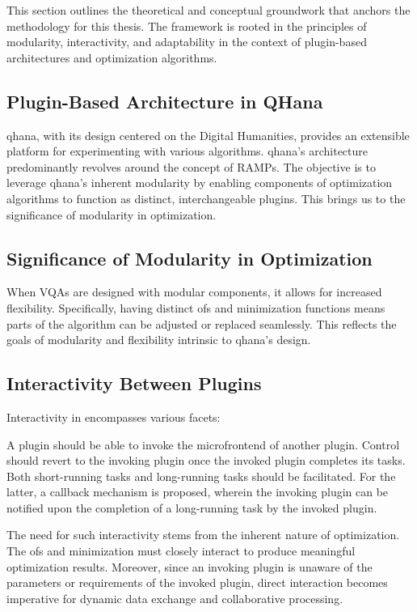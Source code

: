 \documentclass[
  a4paper,  %
  twoside,  %
  bibliography=totoc,
  headsepline,
  cleardoublepage=empty,
  parskip=half,
  draft=false
]{scrbook}
\begin{document}
This section outlines the theoretical and conceptual groundwork that anchors the methodology for this thesis.
The framework is rooted in the principles of modularity, interactivity, and adaptability in the context of plugin-based architectures and optimization algorithms.

\subsection{Plugin-Based Architecture in QHana}
\gls{qhana}, with its design centered on the Digital Humanities, provides an extensible platform for experimenting with various algorithms.
\gls{qhana}'s architecture predominantly revolves around the concept of RAMPs.
The objective is to leverage \gls{qhana}'s inherent modularity by enabling components of optimization algorithms to function as distinct, interchangeable plugins.
This brings us to the significance of modularity in optimization.

\subsection{Significance of Modularity in Optimization}
When VQAs are designed with modular components, it allows for increased flexibility.
Specifically, having distinct \glspl{of} and minimization functions means parts of the algorithm can be adjusted or replaced seamlessly.
This reflects the goals of modularity and flexibility intrinsic to \gls{qhana}'s design.

\subsection{Interactivity Between Plugins}
Interactivity in  encompasses various facets:

A plugin should be able to invoke the microfrontend of another plugin.
Control should revert to the invoking plugin once the invoked plugin completes its tasks.
Both short-running tasks and long-running tasks should be facilitated.
For the latter, a callback mechanism is proposed, wherein the invoking plugin can be notified upon the completion of a long-running task by the invoked plugin.

The need for such interactivity stems from the inherent nature of optimization.
The \glspl{of} and minimization must closely interact to produce meaningful optimization results.
Moreover, since an invoking plugin is unaware of the parameters or requirements of the invoked plugin, direct interaction becomes imperative for dynamic data exchange and collaborative processing.
\end{document}

